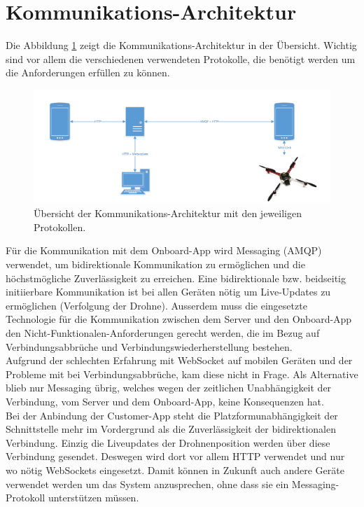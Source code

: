{\section{Kommunikations-Architektur}
\label{sec:communication-architecture}

Die Abbildung \ref{fig:communication-architecture-overview} zeigt die Kommunikations-Architektur in der Übersicht.
Wichtig sind vor allem die verschiedenen verwendeten Protokolle, die benötigt werden um die Anforderungen erfüllen zu können. \\

\begin{figure}[H]
	\includegraphics[width=1.0\textwidth]{images/Communication-Overview-Diagram.pdf}
	\caption{Übersicht der Kommunikations-Architektur mit den jeweiligen Protokollen. }
	\label{fig:communication-architecture-overview}
\end{figure}


Für die Kommunikation mit dem Onboard-App wird Messaging ({\Gls{AMQP}) verwendet, um bidirektionale Kommunikation zu ermöglichen und die höchstmögliche Zuverlässigkeit zu erreichen.
Eine bidirektionale bzw. beidseitig initiierbare Kommunikation ist bei allen Geräten nötig um Live-Updates zu ermöglichen (Verfolgung der Drohne).
Ausserdem muss die eingesetzte Technologie für die Kommunikation zwischen dem Server und den Onboard-App den Nicht-Funktionalen-Anforderungen gerecht werden, die im Bezug auf Verbindungsabbrüche und Verbindungswiederherstellung bestehen.\\

Aufgrund der schlechten Erfahrung mit WebSocket auf mobilen Geräten und der Probleme mit bei Verbindungsabbrüche, kam diese nicht in Frage. Als Alternative blieb nur Messaging übrig, welches wegen der zeitlichen Unabhängigkeit der Verbindung, vom Server und dem Onboard-App, keine Konsequenzen hat. \\

	
Bei der Anbindung der Customer-App steht die Platzformunabhängigkeit der Schnittstelle mehr im Vordergrund als die Zuverlässigkeit der bidirektionalen Verbindung. Einzig die Liveupdates der Drohnenposition werden über diese Verbindung gesendet. Deswegen wird dort vor allem HTTP verwendet und nur wo nötig WebSockets eingesetzt. Damit können in Zukunft auch andere Geräte verwendet werden um das System anzusprechen, ohne dass sie ein Messaging-Protokoll unterstützen müssen.\\

}}
